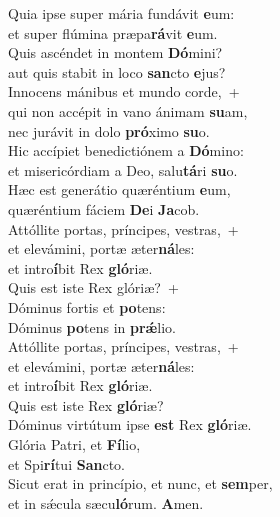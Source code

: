 \evenverse Quia ipse super mária fundávit \textbf{e}um:~\*\\
\evenverse et super flúmina præpa\textbf{rá}vit \textbf{e}um.\\
\oddverse Quis ascéndet in montem \textbf{Dó}mini?~\*\\
\oddverse aut quis stabit in loco \textbf{san}cto \textbf{e}jus?\\
\evenverse Innocens mánibus et mundo corde,~+\\
\evenverse  qui non accépit in vano ánimam \textbf{su}am,~\*\\
\evenverse nec jurávit in dolo \textbf{pró}ximo \textbf{su}o.\\
\oddverse Hic accípiet benedictiónem a \textbf{Dó}mino:~\*\\
\oddverse et misericórdiam a Deo, salu\textbf{tá}ri \textbf{su}o.\\
\evenverse Hæc est generátio quæréntium \textbf{e}um,~\*\\
\evenverse quæréntium fáciem \textbf{De}i \textbf{Ja}cob.\\
\oddverse Attóllite portas, príncipes, vestras,~+\\
\oddverse  et elevámini, portæ æter\textbf{ná}les:~\*\\
\oddverse et intro\textbf{í}bit Rex \textbf{gló}riæ.\\
\evenverse Quis est iste Rex glóriæ?~+\\
\evenverse  Dóminus fortis et \textbf{po}tens:~\*\\
\evenverse Dóminus \textbf{po}tens in \textbf{prǽ}lio.\\
\oddverse Attóllite portas, príncipes, vestras,~+\\
\oddverse  et elevámini, portæ æter\textbf{ná}les:~\*\\
\oddverse et intro\textbf{í}bit Rex \textbf{gló}riæ.\\
\evenverse Quis est iste Rex \textbf{gló}riæ?~\*\\
\evenverse Dóminus virtútum ipse \textbf{est} Rex \textbf{gló}riæ.\\
\oddverse Glória Patri, et \textbf{Fí}lio,~\*\\
\oddverse et Spi\textbf{rí}tui \textbf{San}cto.\\
\evenverse Sicut erat in princípio, et nunc, et \textbf{sem}per,~\*\\
\evenverse et in sǽcula sæcu\textbf{ló}rum. \textbf{A}men.\\

